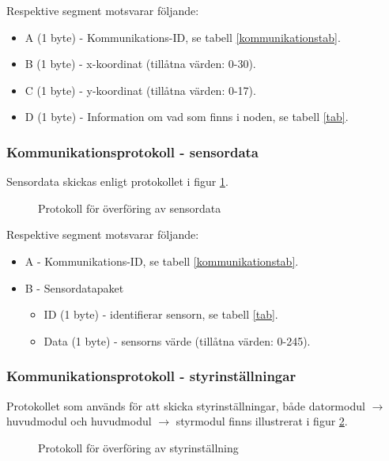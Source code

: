 \documentclass[11pt]{article}
\begin{document}
\begin{flushleft}
Respektive segment motsvarar följande: 
\begin{itemize}
	\item A (1 byte) - Kommunikations-ID, se tabell \ref{kommunikationstab}.
	\item B (1 byte) - x-koordinat (tillåtna värden: 0-30).
	\item C (1 byte) - y-koordinat (tillåtna värden: 0-17).
	\item D (1 byte) - Information om vad som finns i noden, se tabell \ref{tab}.
\end{itemize}

\subsubsection{Kommunikationsprotokoll - sensordata}
Sensordata skickas enligt protokollet i figur \ref{sensordata}.

 \begin{figure}[H]
\centering
\noindent\resizebox{.8\linewidth}{!}{
	}
	\caption{Protokoll för överföring av sensordata\label{sensordata}}	
\end{figure} 

Respektive segment motsvarar följande: 
\begin{itemize}
	\item A - Kommunikations-ID, se tabell \ref{kommunikationstab}.
	\item B - Sensordatapaket
	\begin{itemize}
	\item ID (1 byte) - identifierar sensorn, se tabell \ref{tab}.
	\item Data (1 byte) - sensorns värde (tillåtna värden: 0-245).
	\end{itemize}
\end{itemize}

\subsubsection{Kommunikationsprotokoll - styrinställningar}
Protokollet som används för att skicka styrinställningar, både datormodul $\rightarrow$ huvudmodul och huvudmodul $\rightarrow$ styrmodul finns illustrerat i figur \ref{styrkomm}.

\begin{figure}[htbp]
\centering
\noindent\resizebox{.8\linewidth}{!}{
	}
	\caption{Protokoll för överföring av styrinställning \label{styrkomm}}	
\end{figure}


\end{flushleft}
\end{document}
